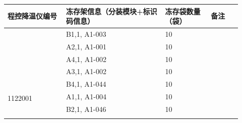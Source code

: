 \documentclass[UTF8,10pt,a4paper,fontset=fandol]{ctexart}
\newcommand{\fieldvalue}[1]{#1}
\newcommand{\handwritten}[1]{#1}
\begin{document}
\small
\begin{center}
\begin{tabular}{|p{0.23\linewidth}|p{0.39\linewidth}|p{0.18\linewidth}|p{0.12\linewidth}|}
\hline
\centering 程控降温仪编号 &
\centering 冻存架信息（分装模块+标识码信息） &
\centering 冻存袋数量（袋） &
\centering 备注 \tabularnewline
\hline
&
\fieldvalue{\handwritten{B1,1, A1-003}} &
\fieldvalue{\handwritten{10}} & \tabularnewline
\hline
&
\fieldvalue{\handwritten{A2,1, A1-001}} &
\fieldvalue{\handwritten{10}} & \tabularnewline
\hline
&
\fieldvalue{\handwritten{A4,1, A1-002}} &
\fieldvalue{\handwritten{10}} & \tabularnewline
\hline
&
\fieldvalue{\handwritten{A3,1, A1-002}} &
\fieldvalue{\handwritten{10}} & \tabularnewline
\hline
\multirow{9}{*}{\fieldvalue{\handwritten{1122001}}} &
\fieldvalue{\handwritten{B4,1, A1-044}} &
\fieldvalue{\handwritten{10}} & \tabularnewline
\cline{2-4}
&
\fieldvalue{\handwritten{A1,1, A1-004}} &
\fieldvalue{\handwritten{10}} & \tabularnewline
\cline{2-4}
&
\fieldvalue{\handwritten{B2,1, A1-046}} &
\fieldvalue{\handwritten{10}} & \tabularnewline
\cline{2-4}
&

\end{tabular}
\end{center}
\end{document}

